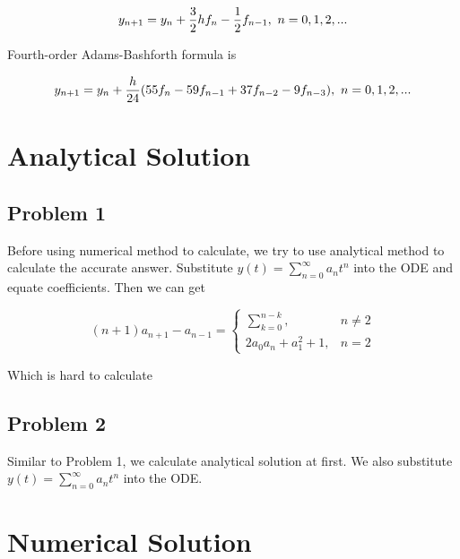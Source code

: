 \documentclass[a4paper]{article}
\begin{document}
	\begin{equation}\label{eq.6}
		y_{n+1} = y_n + {3 \over 2}hf_n - {1 \over 2}f_{n-1}, \  n = 0,1,2,...
	\end{equation}
	
	Fourth-order Adams-Bashforth formula is
	
	\begin{equation}\label{eq.7}
		y_{n+1} = y_n + {h \over 24}(55f_n - 59f_{n-1} + 37f_{n-2} - 9f_{n-3}), \  n = 0,1,2,...
	\end{equation}
	
	
	\section{Analytical Solution}
	
	\subsection{Problem 1}
	
	Before using numerical method to calculate, we try to use analytical method to calculate the accurate answer.
	Substitute $y(t) = \sum_{n=0}^{\infty} a_n t^n$ into the ODE and equate coefficients. Then we can get
	
	\begin{equation}
		(n+1)a_{n+1}-a_{n-1} = 
			\begin{cases}
				\sum_{k=0}^{n-k}, & \text{$n \neq 2$} \\
				2a_0a_n + a_1^2 + 1, & \text{$n = 2$}
			\end{cases}
	\end{equation}

	Which is hard to calculate
	
	
	\subsection{Problem 2}
	
	Similar to Problem 1, we calculate analytical solution at first.
	We also substitute $y(t) = \sum_{n=0}^{\infty} a_n t^n$ into the ODE.
	
	
	\section{Numerical Solution}
	
\end{document}

